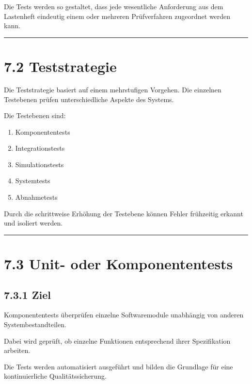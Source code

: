 \documentclass[
]{article}
\providecommand{\tightlist}{%
  \setlength{\itemsep}{0pt}\setlength{\parskip}{0pt}}
\begin{document}
Die Tests werden so gestaltet, dass jede wesentliche Anforderung aus dem
Lastenheft eindeutig einem oder mehreren Prüfverfahren zugeordnet werden
kann.

\begin{center}\rule{0.5\linewidth}{0.5pt}\end{center}

\section{7.2 Teststrategie}\label{teststrategie}

Die Teststrategie basiert auf einem mehrstufigen Vorgehen. Die einzelnen
Testebenen prüfen unterschiedliche Aspekte des Systems.

Die Testebenen sind:

\begin{enumerate}
\def\labelenumi{\arabic{enumi}.}
\tightlist
\item
  Komponententests
\item
  Integrationstests
\item
  Simulationstests
\item
  Systemtests
\item
  Abnahmetests
\end{enumerate}

Durch die schrittweise Erhöhung der Testebene können Fehler frühzeitig
erkannt und isoliert werden.

\begin{center}\rule{0.5\linewidth}{0.5pt}\end{center}

\section{7.3 Unit- oder
Komponententests}\label{unit--oder-komponententests}

\subsection{7.3.1 Ziel}\label{ziel}

Komponententests überprüfen einzelne Softwaremodule unabhängig von
anderen Systembestandteilen.

Dabei wird geprüft, ob einzelne Funktionen entsprechend ihrer
Spezifikation arbeiten.

Die Tests werden automatisiert ausgeführt und bilden die Grundlage für
eine kontinuierliche Qualitätssicherung.
\end{document}
